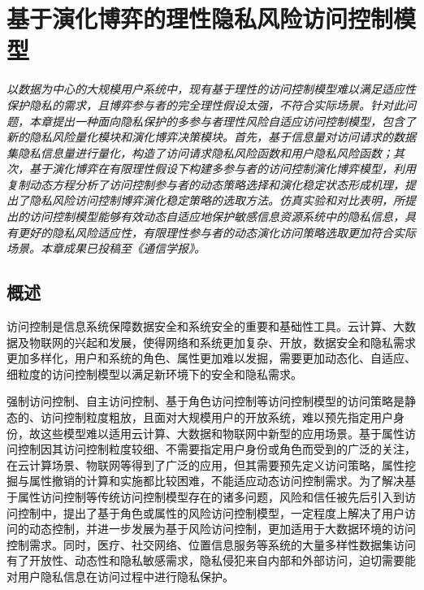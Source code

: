 \chapter{基于演化博弈的理性隐私风险访问控制模型}
\label{chap:evolutionary-rabac}

\textit{ }

\textit{以数据为中心的大规模用户系统中，现有基于理性的访问控制模型难以满足适应性保护隐私的需求，且博弈参与者的完全理性假设太强，不符合实际场景。针对此问题，本章提出一种面向隐私保护的多参与者理性风险自适应访问控制模型，包含了新的隐私风险量化模块和演化博弈决策模块。首先，基于信息量对访问请求的数据集隐私信息量进行量化，构造了访问请求隐私风险函数和用户隐私风险函数；其次，基于演化博弈在有限理性假设下构建多参与者的访问控制演化博弈模型，利用复制动态方程分析了访问控制参与者的动态策略选择和演化稳定状态形成机理，提出了隐私风险访问控制博弈演化稳定策略的选取方法。仿真实验和对比表明，所提出的访问控制模型能够有效动态自适应地保护敏感信息资源系统中的隐私信息，具有更好的隐私风险适应性，有限理性参与者的动态演化访问策略选取更加符合实际场景。本章成果已投稿至《通信学报》。}

\section{概述}
访问控制是信息系统保障数据安全和系统安全的重要和基础性工具\cite{sandhu1994access}。云计算、大数据及物联网的兴起和发展，使得网络和系统更加复杂、开放，数据安全和隐私需求更加多样化，用户和系统的角色、属性更加难以发掘，需要更加动态化、自适应、细粒度的访问控制模型以满足新环境下的安全和隐私需求\cite{li2017access}。

强制访问控制\cite{mccune2006shamon}、自主访问控制\cite{downs1985issues}、基于角色访问控制\cite{sandhu1996role}等访问控制模型的访问策略是静态的、访问控制粒度粗放，且面对大规模用户的开放系统，难以预先指定用户身份，故这些模型难以适用云计算、大数据和物联网中新型的应用场景。基于属性访问控制\cite{wang2010hierarchical}因其访问控制粒度较细、不需要指定用户身份或角色而受到的广泛的关注，在云计算场景、物联网等得到了广泛的应用，但其需要预先定义访问策略，属性挖掘与属性撤销的计算和实施都比较困难，不能适应动态访问控制需求\cite{servos2017current}。为了解决基于属性访问控制等传统访问控制模型存在的诸多问题，风险和信任被先后引入到访问控制中，提出了基于角色或属性的风险访问控制模型\cite{dimmock2004using,kandala2011attribute,krautsevich2014towards}，一定程度上解决了用户访问的动态控制，并进一步发展为基于风险访问控制\cite{cheng2007fuzzy,ni2010risk}，更加适用于大数据环境的访问控制需求。同时，医疗、社交网络、位置信息服务等系统的大量多样性数据集访问有了开放性、动态性和隐私敏感需求，隐私侵犯来自内部和外部访问\cite{boulares2017insider}，迫切需要能对用户隐私信息在访问过程中进行隐私保护。

